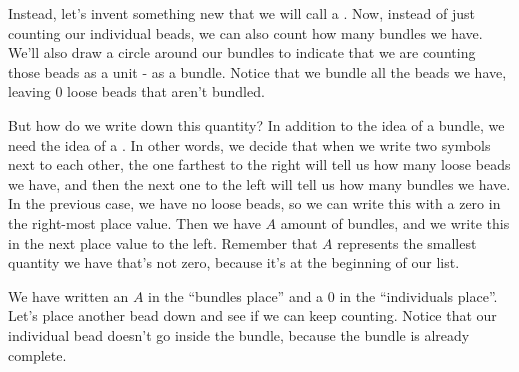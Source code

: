 \documentclass{ximera}
\begin{document}
Instead, let's invent something new that we will call a . Now, instead of just counting our individual beads, we can also count how many bundles we have. We'll also draw a circle around our bundles to indicate that we are counting those beads as a unit - as a bundle. Notice that we bundle all the beads we have, leaving $0$ loose beads that aren't bundled.

\begin{image}
\end{image}

But how do we write down this quantity? In addition to the idea of a bundle, we need the idea of a . In other words, we decide that when we write two symbols next to each other, the one farthest to the right will tell us how many loose beads we have, and then the next one to the left will tell us how many bundles we have. In the previous case, we have no loose beads, so we can write this with a zero in the right-most place value. Then we have $A$ amount of bundles, and we write this in the next place value to the left. Remember that $A$ represents the smallest quantity we have that's not zero, because it's at the beginning of our list.

\begin{image}
\end{image}

We have written an $A$ in the ``bundles place'' and a $0$ in the ``individuals place''. Let's place another bead down and see if we can keep counting. Notice that our individual bead doesn't go inside the bundle, because the bundle is already complete.

\begin{image}
\end{image}
\end{document}
